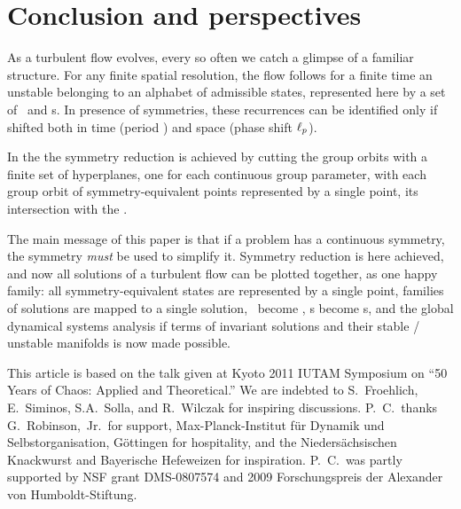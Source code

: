 
\section{Conclusion and perspectives}
\label{s:concl}


As a turbulent flow evolves, every so often we catch a glimpse of a
familiar structure. For any finite spatial resolution, the flow follows
for a finite time an unstable {\cohStr} belonging to an alphabet of
admissible states, represented here by a set of \reqva\ and \rpo s. In
presence of symmetries, these recurrences can be identified only if
shifted both in time (period ) and space (phase shift
$\ell_p$).

In the \mslices{} the
symmetry reduction is achieved by cutting the group orbits with a finite
set of hyperplanes, one for each continuous group parameter, with each
group orbit of symmetry-equivalent points represented by a single point,
its intersection with the \slice.

The main message of this paper is that if a problem has a continuous
symmetry, the symmetry \emph{must} be used to simplify it. Symmetry
reduction is here achieved, and now all solutions of a turbulent flow can
be plotted together, as one happy family: all symmetry-equivalent states
are represented by a single point, families of solutions are mapped to a
single solution, \reqva\ become \eqva, \rpo s become \po s, and the
global dynamical systems analysis if terms of invariant solutions and
their stable / unstable manifolds is now made possible.

\begin{acknowledgments}
This article is based on the talk given at
Kyoto 2011 IUTAM Symposium on ``50 Years of Chaos: Applied and Theoretical.''
We are indebted to
S.~Froehlich,
E.~Siminos,
S.A.~Solla,
and
R.~Wilczak
for inspiring discussions.
P.~C.\ thanks G.~Robinson,~Jr.\ for support,
Max-Planck-Institut f\"ur Dynamik und Selbstorganisation,
G\"ottingen for hospitality,
and the Nieders\"achsischen Knackwurst and Bayerische Hefeweizen for inspiration.
P.~C.\ was partly supported by NSF grant DMS-0807574
and
2009 Forschungspreis der Alexander von Humboldt-Stiftung.
\end{acknowledgments}
